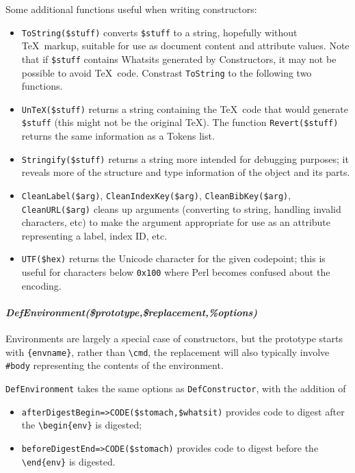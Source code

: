 \documentclass{book}
\newcommand{\ltxcode}{\lstinline[style=inlinelatexml]}
\begin{document}
Some additional functions useful when writing constructors:
\begin{itemize}
\item \ltxcode|ToString($stuff)| converts \ltxcode|$stuff| to a string,
  hopefully without \TeX\ markup, suitable for use as document content
  and attribute values.  Note that if \ltxcode|$stuff| contains Whatsits
  generated by Constructors, it may not be possible to avoid \TeX\ code.
  Constrast \ltxcode|ToString| to the following two functions.
\item \ltxcode|UnTeX($stuff)| returns a string containing the \TeX\ code
  that would generate \ltxcode|$stuff| (this might not be the original \TeX).
  The function \ltxcode|Revert($stuff)| returns the same information as a Tokens list.
\item \ltxcode|Stringify($stuff)| returns a string more intended
  for debugging purposes; it reveals more of the structure and type information
  of the object and its parts.
\item \ltxcode|CleanLabel($arg)|,
   \ltxcode|CleanIndexKey($arg)|,
   \ltxcode|CleanBibKey($arg)|,\hfil\\
   \ltxcode|CleanURL($arg)|
  cleans up arguments (converting to string, handling invalid characters, etc)
  to make the argument appropriate for use as an attribute representing
  a label, index ID, etc.
\item \ltxcode|UTF($hex)| returns the Unicode character for the given
codepoint; this is useful for characters below \texttt{0x100} where
Perl becomes confused about the encoding.
\end{itemize}

\paragraph[DefEnvironment]{%
  \textit{DefEnvironment(\textit{\$prototype},\textit{\$replacement},\textit{\%options})}}
Environments are largely a special case of constructors,
but the prototype starts with \verb|{envname}|, rather than \verb|\cmd|,
the replacement will also typically involve \verb|#body| representing
the contents of the environment.

\texttt{DefEnvironment} takes the same options as  \texttt{DefConstructor},
with the addition of
\begin{itemize}
\item \ltxcode|afterDigestBegin=>CODE($stomach,$whatsit)|
provides code to digest after the \verb|\begin{env}| is digested;
\item \ltxcode|beforeDigestEnd=>CODE($stomach)|
provides code to digest before the \verb|\end{env}| is digested.
\end{itemize}
\end{document}
